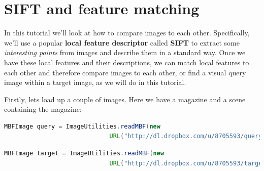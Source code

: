\chapter{SIFT and feature matching}
In this tutorial we'll look at how to compare images to each other. Specifically, we'll use a
popular \textbf{local feature descriptor} called \textbf{SIFT} to extract some \emph{interesting points} 
from images and describe them in a standard way. Once we have these local features and their 
descriptions, we can match local features to each other and therefore compare images to each 
other, or find a visual query image within a target image, as we will do in this tutorial.

Firstly, lets load up a couple of images. Here we have a magazine and a scene containing the 
magazine:
\begin{lstlisting}[language=java]
MBFImage query = ImageUtilities.readMBF(new 
                             URL("http://dl.dropbox.com/u/8705593/query.jpg"));
\end{lstlisting}
\begin{lstlisting}[language=java]
MBFImage target = ImageUtilities.readMBF(new 
                             URL("http://dl.dropbox.com/u/8705593/target.jpg"));
\end{lstlisting}

